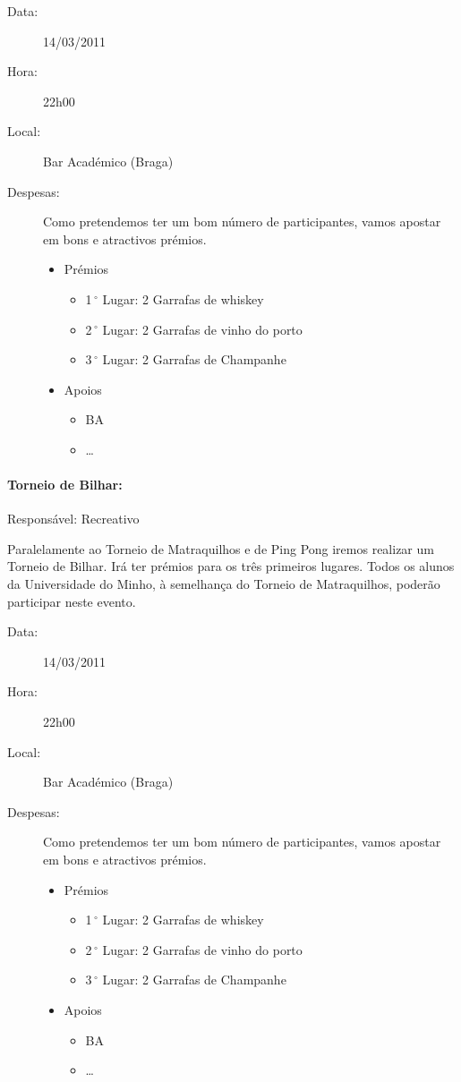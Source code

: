 \begin{description}
	\item[Data:] 14/03/2011
	\item[Hora:] 22h00
	\item[Local:] Bar Académico (Braga)
	\item[Despesas:] Como pretendemos ter um bom número de participantes, vamos apostar em bons e atractivos prémios.
	\begin{itemize}
		\item Prémios
		\begin{itemize}
			\item 1$\,^{\circ}$ Lugar: 2 Garrafas de whiskey
			\item 2$\,^{\circ}$ Lugar: 2 Garrafas de vinho do porto
			\item 3$\,^{\circ}$ Lugar: 2 Garrafas de Champanhe
		\end{itemize}
		\item Apoios
		\begin{itemize}
			\item BA
			\item \dots  
		\end{itemize}
	\end{itemize}
\end{description}

\paragraph{Torneio de Bilhar:}
Responsável: Recreativo

Paralelamente ao Torneio de Matraquilhos e de Ping Pong iremos realizar um Torneio de Bilhar. Irá ter prémios para os três primeiros lugares. Todos os alunos da Universidade do Minho, à semelhança do Torneio de Matraquilhos, poderão participar neste evento.

\begin{description}
	\item[Data:] 14/03/2011
	\item[Hora:] 22h00
	\item[Local:] Bar Académico (Braga)
	\item[Despesas:] Como pretendemos ter um bom número de participantes, vamos apostar em bons e atractivos prémios.
	\begin{itemize}
		\item Prémios
		\begin{itemize}
			\item 1$\,^{\circ}$ Lugar: 2 Garrafas de whiskey
			\item 2$\,^{\circ}$ Lugar: 2 Garrafas de vinho do porto
			\item 3$\,^{\circ}$ Lugar: 2 Garrafas de Champanhe
		\end{itemize}
		\item Apoios
		\begin{itemize}
			\item BA
			\item \dots  
		\end{itemize}
	\end{itemize}
\end{description}



